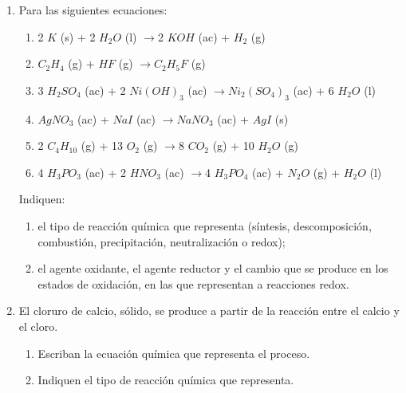 \documentclass[../Práctica.root.tex]{subfiles}
\newcommand{\lra}{\ensuremath{\longrightarrow{}}}
\begin{document}
\begin{enumerate}
    \item Para las siguientes ecuaciones:
          \begin{enumerate}
              \item 2 $K$ (s) + 2 $H_2O$ (l) \lra 2 $KOH$ (ac) + $H_2$ (g)
              \item $C_2H_4$ (g) + $HF$ (g) \lra $C_2H_5F$ (g)
              \item 3 $H_2SO_4$ (ac) + 2 $Ni(OH)_3$ (ac) \lra $Ni_2(SO_4)_3$ (ac) + 6 $H_2O$ (l)
              \item $AgNO_3$ (ac) + $NaI$ (ac) \lra $NaNO_3$ (ac) + $AgI$ (s)
              \item 2 $C_4H_{10}$ (g) + 13 $O_2$ (g) \lra 8 $CO_2$ (g) + 10 $H_2O$ (g)
              \item 4 $H_3PO_3$ (ac) + 2 $HNO_3$ (ac) \lra 4 $H_3PO_4$ (ac) + $N_2O$ (g) + $H_2O$ (l)
          \end{enumerate}
          Indiquen:
          \begin{enumerate}
              \item el tipo de reacción química que representa (síntesis, descomposición, combustión,
                    precipitación, neutralización o redox);
              \item el agente oxidante, el agente reductor y el cambio que se produce en los estados de
                    oxidación, en las que representan a reacciones redox.
          \end{enumerate}

    \item El cloruro de calcio, sólido, se produce a partir de la reacción entre el calcio y el cloro.
          \begin{enumerate}
              \item Escriban la ecuación química que representa el proceso.
              \item Indiquen el tipo de reacción química que representa.
          \end{enumerate}
\end{enumerate}
\end{document}
